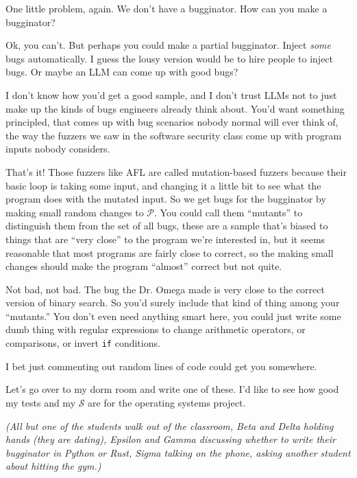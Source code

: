 \documentclass[sigplan]{acmart}
\begin{document}
  One little problem, again.   We don't
have a bugginator.  How can you make a bugginator?

   Ok, you can't.  But perhaps you could
make a partial bugginator.  Inject \emph{some} bugs automatically.  I
guess the lousy version would be to hire people to inject bugs.  Or
maybe an LLM can come up with good bugs?

  I don't know how you'd get a good sample,
and I don't trust LLMs not to just make up the kinds of bugs engineers
already think about.  You'd want something principled, that comes up
with bug scenarios nobody normal will ever think of, the way the
fuzzers we saw in the software security class
come up with program inputs nobody considers.

  That's it!  Those fuzzers like AFL are
called mutation-based fuzzers because their basic loop is taking some
input, and changing it a little bit to see what the program does with
the mutated input.  So we get bugs for the bugginator by making small
random changes to $\mathcal{P}$.  You could call them ``mutants'' to
distinguish them from the set of all bugs, these are a sample that's
biased to things that are ``very close'' to the program we're
interested in, but it seems reasonable that most programs are fairly
close to correct, so the making small changes should make the program
``almost'' correct but not quite.

   Not bad, not bad.  The bug the Dr. Omega
made is very close to the correct version of binary search.  So you'd
surely include that kind of thing among your ``mutants.''   You don't
even need anything smart here, you could just write some dumb thing
with regular expressions to change arithmetic operators, or
comparisons, or invert {\tt if} conditions.

  I bet just commenting out random lines
of code could get you somewhere.

 Let's go over to my dorm room and write
one of these.  I'd like to see how good my tests and my $\mathcal{S}$
are for the operating systems project.

\vspace{0.1in}

\emph{(All but one of the students walk out of the classroom, Beta and Delta holding
  hands (they are dating), Epsilon and Gamma discussing whether to
  write their bugginator in Python or Rust, Sigma talking on the
  phone, asking another student about hitting the gym.)}
\end{document}
